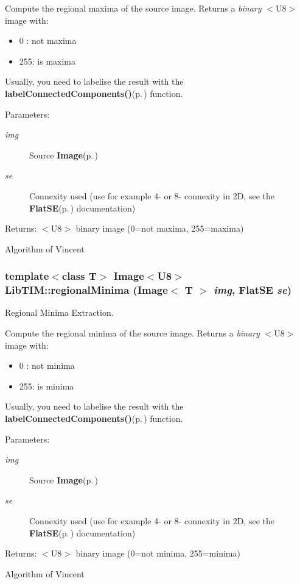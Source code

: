 Compute the regional maxima of the source image. Returns a {\em binary\/} $<$U8$>$ image with: \begin{itemize}
\item 0 : not maxima \item 255: is maxima\end{itemize}
Usually, you need to labelise the result with the {\bf label\-Connected\-Components()}{\rm (p.\,\pageref{group__ccLabelling_ga0})} function. \begin{Desc}
\item[Parameters:]
\begin{description}
\item[{\em img}]Source {\bf Image}{\rm (p.\,\pageref{classLibTIM_1_1Image})} \item[{\em se}]Connexity used (use for example 4- or 8- connexity in 2D, see the {\bf Flat\-SE}{\rm (p.\,\pageref{classLibTIM_1_1FlatSE})} documentation) \end{description}
\end{Desc}
\begin{Desc}
\item[Returns:]$<$U8$>$ binary image (0=not maxima, 255=maxima)\end{Desc}
Algorithm of Vincent
\subsubsection{\setlength{\rightskip}{0pt plus 5cm}template$<$class T$>$ Image$<${\bf U8}$>$ Lib\-TIM::regional\-Minima (Image$<$ T $>$ {\em img}, Flat\-SE {\em se})}\label{group__extremaExtraction_ga0}


Regional Minima Extraction. 

Compute the regional minima of the source image. Returns a {\em binary\/} $<$U8$>$ image with: \begin{itemize}
\item 0 : not minima \item 255: is minima\end{itemize}
Usually, you need to labelise the result with the {\bf label\-Connected\-Components()}{\rm (p.\,\pageref{group__ccLabelling_ga0})} function. \begin{Desc}
\item[Parameters:]
\begin{description}
\item[{\em img}]Source {\bf Image}{\rm (p.\,\pageref{classLibTIM_1_1Image})} \item[{\em se}]Connexity used (use for example 4- or 8- connexity in 2D, see the {\bf Flat\-SE}{\rm (p.\,\pageref{classLibTIM_1_1FlatSE})} documentation) \end{description}
\end{Desc}
\begin{Desc}
\item[Returns:]$<$U8$>$ binary image (0=not minima, 255=minima)\end{Desc}
Algorithm of Vincent